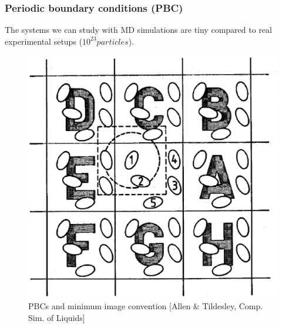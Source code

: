 \documentclass{beamer}
\begin{document}
\begin{frame}\frametitle{Periodic boundary conditions (PBC)}
The systems we can study with MD simulations are tiny compared to real experimental setups ($10^{23} particles$).

\begin{figure}
\includegraphics[scale=0.2]{pbc.eps}
\caption{{\scriptsize PBCs and minimum image convention [Allen \& Tildesley, Comp. Sim. of Liquids]}}
\end{figure}

\end{frame}

\end{document}
